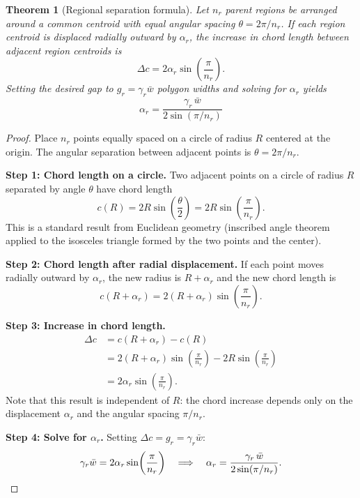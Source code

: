 \documentclass[12pt, a4paper]{article}
\numberwithin{equation}{section}
\theoremstyle{definition}
\theoremstyle{plain}
\newtheorem{theorem}{Theorem}[section]
\theoremstyle{remark}
\begin{document}
\begin{theorem}[Regional separation formula]
\label{thm:alpha_r}
Let $n_r$ parent regions be arranged around a common centroid with equal angular spacing $\theta = 2\pi/n_r$. If each region centroid is displaced radially outward by $\alpha_r$, the increase in chord length between adjacent region centroids is
\begin{equation}
  \Delta c = 2\alpha_r\sin\!\left(\frac{\pi}{n_r}\right).
  \label{eq:chord_increase}
\end{equation}
Setting the desired gap to $g_r = \gamma_r\bar{w}$ polygon widths and solving for $\alpha_r$ yields
\begin{equation}
  \boxed{\alpha_r = \frac{\gamma_r\,\bar{w}}{2\sin(\pi/n_r)}}
  \label{eq:alpha_r}
\end{equation}
\end{theorem}

\begin{proof}
Place $n_r$ points equally spaced on a circle of radius $R$ centered at the origin. The angular separation between adjacent points is $\theta = 2\pi/n_r$.

\medskip\noindent\textbf{Step 1: Chord length on a circle.}
Two adjacent points on a circle of radius $R$ separated by angle $\theta$ have chord length
\begin{equation}
  c(R) = 2R\sin\!\left(\frac{\theta}{2}\right) = 2R\sin\!\left(\frac{\pi}{n_r}\right).
  \label{eq:chord}
\end{equation}
This is a standard result from Euclidean geometry (inscribed angle theorem applied to the isosceles triangle formed by the two points and the center).

\medskip\noindent\textbf{Step 2: Chord length after radial displacement.}
If each point moves radially outward by $\alpha_r$, the new radius is $R + \alpha_r$ and the new chord length is
\begin{equation}
  c(R + \alpha_r) = 2(R + \alpha_r)\sin\!\left(\frac{\pi}{n_r}\right).
  \label{eq:chord_new}
\end{equation}

\medskip\noindent\textbf{Step 3: Increase in chord length.}
\begin{align}
  \Delta c &= c(R + \alpha_r) - c(R) \nonumber \\
  &= 2(R + \alpha_r)\sin\!\left(\frac{\pi}{n_r}\right) - 2R\sin\!\left(\frac{\pi}{n_r}\right) \nonumber \\
  &= 2\alpha_r\sin\!\left(\frac{\pi}{n_r}\right). \label{eq:delta_c_proof}
\end{align}
Note that this result is independent of $R$: the chord increase depends only on the displacement $\alpha_r$ and the angular spacing $\pi/n_r$.

\medskip\noindent\textbf{Step 4: Solve for $\alpha_r$.}
Setting $\Delta c = g_r = \gamma_r\bar{w}$:
\[
  \gamma_r\bar{w} = 2\alpha_r\sin\!\left(\frac{\pi}{n_r}\right)
  \quad\Longrightarrow\quad
  \alpha_r = \frac{\gamma_r\,\bar{w}}{2\sin(\pi/n_r)}. \qedhere
\]
\end{proof}
\end{document}
